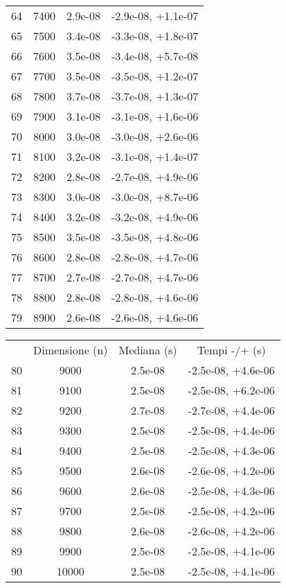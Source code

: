 \begin{table}
\begin{adjustbox}{width=1\textwidth/2}
\begin{tabular}{|c|c|c|c|}
\cline{1-4}
64 & 7400 & 2.9e-08 & -2.9e-08, +1.1e-07 \\
\cline{1-4}
65 & 7500 & 3.4e-08 & -3.3e-08, +1.8e-07 \\
\cline{1-4}
66 & 7600 & 3.5e-08 & -3.4e-08, +5.7e-08 \\
\cline{1-4}
67 & 7700 & 3.5e-08 & -3.5e-08, +1.2e-07 \\
\cline{1-4}
68 & 7800 & 3.7e-08 & -3.7e-08, +1.3e-07 \\
\cline{1-4}
69 & 7900 & 3.1e-08 & -3.1e-08, +1.6e-06 \\
\cline{1-4}
70 & 8000 & 3.0e-08 & -3.0e-08, +2.6e-06 \\
\cline{1-4}
71 & 8100 & 3.2e-08 & -3.1e-08, +1.4e-07 \\
\cline{1-4}
72 & 8200 & 2.8e-08 & -2.7e-08, +4.9e-06 \\
\cline{1-4}
73 & 8300 & 3.0e-08 & -3.0e-08, +8.7e-06 \\
\cline{1-4}
74 & 8400 & 3.2e-08 & -3.2e-08, +4.9e-06 \\
\cline{1-4}
75 & 8500 & 3.5e-08 & -3.5e-08, +4.8e-06 \\
\cline{1-4}
76 & 8600 & 2.8e-08 & -2.8e-08, +4.7e-06 \\
\cline{1-4}
77 & 8700 & 2.7e-08 & -2.7e-08, +4.7e-06 \\
\cline{1-4}
78 & 8800 & 2.8e-08 & -2.8e-08, +4.6e-06 \\
\cline{1-4}
79 & 8900 & 2.6e-08 & -2.6e-08, +4.6e-06 \\
\cline{1-4}
\end{tabular}
\end{adjustbox}
\end{table}

\begin{table}
\centering
\begin{adjustbox}{width=1\textwidth/2}
\begin{tabular}{|c|c|c|c|}
\hline
 & Dimensione (n) & Mediana (s) & Tempi -/+ (s) \\
80 & 9000 & 2.5e-08 & -2.5e-08, +4.6e-06 \\
\cline{1-4}
81 & 9100 & 2.5e-08 & -2.5e-08, +6.2e-06 \\
\cline{1-4}
82 & 9200 & 2.7e-08 & -2.7e-08, +4.4e-06 \\
\cline{1-4}
83 & 9300 & 2.5e-08 & -2.5e-08, +4.4e-06 \\
\cline{1-4}
84 & 9400 & 2.5e-08 & -2.5e-08, +4.3e-06 \\
\cline{1-4}
85 & 9500 & 2.6e-08 & -2.6e-08, +4.2e-06 \\
\cline{1-4}
86 & 9600 & 2.6e-08 & -2.5e-08, +4.3e-06 \\
\cline{1-4}
87 & 9700 & 2.5e-08 & -2.5e-08, +4.2e-06 \\
\cline{1-4}
88 & 9800 & 2.6e-08 & -2.6e-08, +4.2e-06 \\
\cline{1-4}
89 & 9900 & 2.5e-08 & -2.5e-08, +4.1e-06 \\
\cline{1-4}
90 & 10000 & 2.5e-08 & -2.5e-08, +4.1e-06 \\
\cline{1-4}
\end{tabular}
\end{adjustbox}
\end{table}
